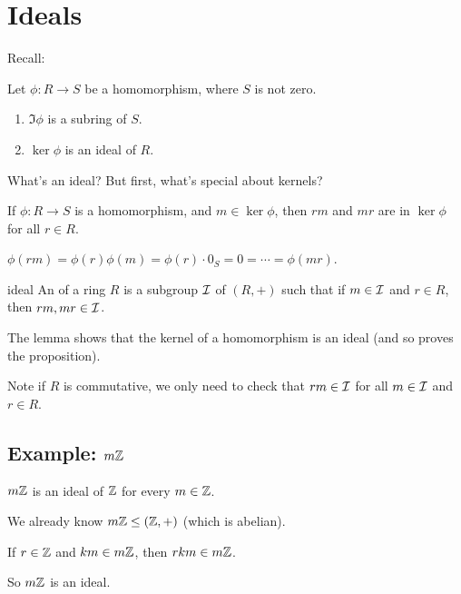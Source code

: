 \documentclass[12pt,letterpaper]{report}
\begin{document}

\section{Ideals}

Recall:

\begin{prop}{}{}
  Let $\phi \colon R \to S$ be a homomorphism, where $S$ is not zero.
  \begin{enumerate}
    \item $\Im\phi$ is a subring of $S$.
    \item $\ker\phi$ is an ideal of $R$.
  \end{enumerate}
\end{prop}

What's an ideal?
But first, what's special about kernels?

\begin{lem}{}{}
  If $\phi \colon R \to S$ is a homomorphism, and $m \in \ker\phi$, then $rm$ and $mr$ are in
  $\ker\phi$ for all $r \in R$.
\end{lem}

\begin{thmproof}
  $\phi(rm) = \phi(r)\phi(m) = \phi(r) \cdot 0_S = 0 = \cdots = \phi(mr)$.
\end{thmproof}

\begin{defn}{ideal}{}
  An  of a ring $R$ is a subgroup $\mathcal{I}$ of $(R, +)$ such that if
  $m \in \mathcal{I}$ and $r \in R$, then $rm, mr \in \mathcal{I}$.
\end{defn}

The lemma shows that the kernel of a homomorphism is an ideal (and so proves the proposition).

Note if $R$ is commutative, we only need to check that $rm \in \mathcal{I}$ for all
$m \in \mathcal{I}$ and $r \in R$.

\pagebreak
\subsection[Example: mZ]{Example: $m\mathbb{Z}$}

\begin{lem}{}{}
  $m\mathbb{Z}$ is an ideal of $\mathbb{Z}$ for every $m \in \mathbb{Z}$.
\end{lem}

\begin{thmproof}
  We already know $m\mathbb{Z} \leq (\mathbb{Z}, +)$ (which is abelian).

  If $r \in \mathbb{Z}$ and $km \in m\mathbb{Z}$, then $rkm \in m\mathbb{Z}$.

  So $m\mathbb{Z}$ is an ideal.
\end{thmproof}
\end{document}
